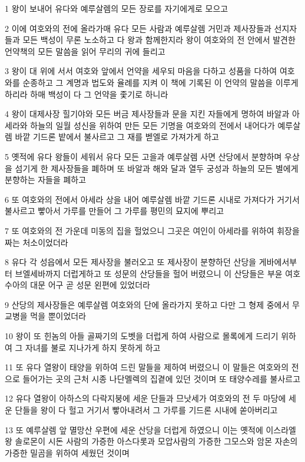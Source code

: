 \par 1 왕이 보내어 유다와 예루살렘의 모든 장로를 자기에게로 모으고
\par 2 이에 여호와의 전에 올라가매 유다 모든 사람과 예루살렘 거민과 제사장들과 선지자들과 모든 백성이 무론 노소하고 다 왕과 함께한지라 왕이 여호와의 전 안에서 발견한 언약책의 모든 말씀을 읽어 무리의 귀에 들리고
\par 3 왕이 대 위에 서서 여호와 앞에서 언약을 세우되 마음을 다하고 성품을 다하여 여호와를 순종하고 그 계명과 법도와 율례를 지켜 이 책에 기록된 이 언약의 말씀을 이루게 하리라 하매 백성이 다 그 언약을 좇기로 하니라
\par 4 왕이 대제사장 힐기야와 모든 버금 제사장들과 문을 지킨 자들에게 명하여 바알과 아세라와 하늘의 일월 성신을 위하여 만든 모든 기명을 여호와의 전에서 내어다가 예루살렘 바깥 기드론 밭에서 불사르고 그 재를 벧엘로 가져가게 하고
\par 5 옛적에 유다 왕들이 세워서 유다 모든 고을과 예루살렘 사면 산당에서 분향하며 우상을 섬기게 한 제사장들을 폐하며 또 바알과 해와 달과 열두 궁성과 하늘의 모든 별에게 분향하는 자들을 폐하고
\par 6 또 여호와의 전에서 아세라 상을 내어 예루살렘 바깥 기드론 시내로 가져다가 거기서 불사르고 빻아서 가루를 만들어 그 가루를 평민의 묘지에 뿌리고
\par 7 또 여호와의 전 가운데 미동의 집을 헐었으니 그곳은 여인이 아세라를 위하여 휘장을 짜는 처소이었더라
\par 8 유다 각 성읍에서 모든 제사장을 불러오고 또 제사장이 분향하던 산당을 게바에서부터 브엘세바까지 더럽게하고 또 성문의 산당들을 헐어 버렸으니 이 산당들은 부윤 여호수아의 대문 어구 곧 성문 왼편에 있었더라
\par 9 산당의 제사장들은 예루살렘 여호와의 단에 올라가지 못하고 다만 그 형제 중에서 무교병을 먹을 뿐이었더라
\par 10 왕이 또 힌놈의 아들 골짜기의 도벳을 더럽게 하여 사람으로 몰록에게 드리기 위하여 그 자녀를 불로 지나가게 하지 못하게 하고
\par 11 또 유다 열왕이 태양을 위하여 드린 말들을 제하여 버렸으니 이 말들은 여호와의 전으로 들어가는 곳의 근처 시종 나단멜렉의 집곁에 있던 것이며 또 태양수레를 불사르고
\par 12 유다 열왕이 아하스의 다락지붕에 세운 단들과 므낫세가 여호와의 전 두 마당에 세운 단들을 왕이 다 헐고 거기서 빻아내려서 그 가루를 기드론 시내에 쏟아버리고
\par 13 또 예루살렘 앞 멸망산 우편에 세운 산당을 더럽게 하였으니 이는 옛적에 이스라엘왕 솔로몬이 시돈 사람의 가증한 아스다롯과 모압사람의 가증한 그모스와 암몬 자손의 가증한 밀곰을 위하여 세웠던 것이며
